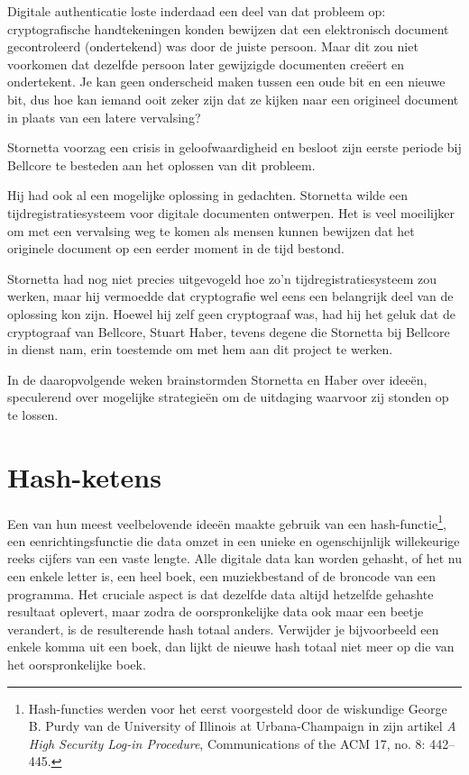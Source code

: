 \documentclass[
  a5paper,
  smalldemyvopaper,11pt,twoside,onecolumn,openright,extrafontsizes,
hidelinks]{memoir}
\begin{document}
Digitale authenticatie loste inderdaad een deel van dat probleem op:
cryptografische handtekeningen konden bewijzen dat een elektronisch
document gecontroleerd (ondertekend) was door de juiste persoon. Maar
dit zou niet voorkomen dat dezelfde persoon later gewijzigde documenten
creëert en ondertekent. Je kan geen onderscheid maken tussen een oude
bit en een nieuwe bit, dus hoe kan iemand ooit zeker zijn dat ze kijken
naar een origineel document in plaats van een latere vervalsing?

Stornetta voorzag een crisis in geloofwaardigheid en besloot zijn eerste
periode bij Bellcore te besteden aan het oplossen van dit probleem.

Hij had ook al een mogelijke oplossing in gedachten. Stornetta wilde een
tijdregistratiesysteem voor digitale documenten ontwerpen. Het is veel
moeilijker om met een vervalsing weg te komen als mensen kunnen bewijzen
dat het originele document op een eerder moment in de tijd bestond.

Stornetta had nog niet precies uitgevogeld hoe zo'n
tijdregistratiesysteem zou werken, maar hij vermoedde dat cryptografie
wel eens een belangrijk deel van de oplossing kon zijn. Hoewel hij zelf
geen cryptograaf was, had hij het geluk dat de cryptograaf van Bellcore,
Stuart Haber, tevens degene die Stornetta bij Bellcore in dienst nam,
erin toestemde om met hem aan dit project te werken.

In de daaropvolgende weken brainstormden Stornetta en Haber over ideeën,
speculerend over mogelijke strategieën om de uitdaging waarvoor zij
stonden op te lossen.

\section{Hash-ketens}\label{hash-ketens}

Een van hun meest veelbelovende ideeën maakte gebruik van een
hash-functie\footnote{Hash-functies werden voor het eerst voorgesteld
  door de wiskundige George B. Purdy van de University of Illinois at
  Urbana-Champaign in zijn artikel \emph{A High Security Log-in
  Procedure}, Communications of the ACM 17, no. 8: 442--445.}, een
eenrichtingsfunctie die data omzet in een unieke en ogenschijnlijk
willekeurige reeks cijfers van een vaste lengte. Alle digitale data kan
worden gehasht, of het nu een enkele letter is, een heel boek, een
muziekbestand of de broncode van een programma. Het cruciale aspect is
dat dezelfde data altijd hetzelfde gehashte resultaat oplevert, maar
zodra de oorspronkelijke data ook maar een beetje verandert, is de
resulterende hash totaal anders. Verwijder je bijvoorbeeld een enkele
komma uit een boek, dan lijkt de nieuwe hash totaal niet meer op die van
het oorspronkelijke boek.
\end{document}
